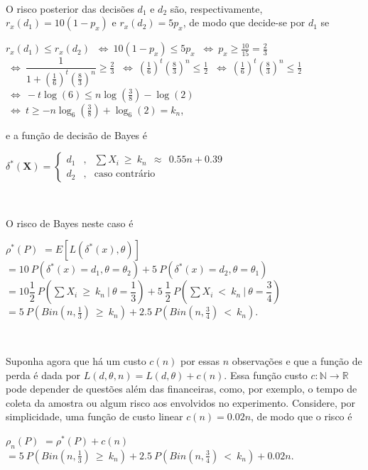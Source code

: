 \documentclass[
]{book}
\begin{document}
\(~\)

O risco posterior das decisões \(d_1\) e \(d_2\) são, respectivamente, \(r_x(d_1)=10(1-p_x)\) e \(r_x(d_2)=5p_x\), de modo que decide-se por \(d_1\) se

\(r_x(d_1)\leq r_x(d_2)\) \(~\Longleftrightarrow~ 10(1-p_x) \leq 5p_x\)
\(~\Longleftrightarrow~ p_x \geq \frac{10}{15}= \frac{2}{3}\)
\(~\Longleftrightarrow~ \dfrac{1}{1+\left(\frac{1}{6}\right)^t\left(\frac{8}{3}\right)^{n}} \geq \frac{2}{3}\)
\(~\Longleftrightarrow~ \left(\frac{1}{6}\right)^t\left(\frac{8}{3}\right)^{n} \leq \frac{1}{2}\)
\(~\Longleftrightarrow~ \left(\frac{1}{6}\right)^t\left(\frac{8}{3}\right)^{n} \leq \frac{1}{2}\)
\(~\Longleftrightarrow~ -t\log(6) \leq n\log\left(\frac{3}{8}\right)-\log\left(2\right)\)
\(~\Longleftrightarrow~ t\geq -n\log_6\left(\frac{3}{8}\right)+\log_6\left(2\right) = k_n\),

e a função de decisão de Bayes é

\({\delta}^*(\boldsymbol X) = \left\{ \begin{array}{ccl} d_1 &,& \sum X_i ~\geq~ k_n ~~\approx~~ 0.55 n + 0.39 \\ d_2 &,& \text{caso contrário} \end{array}\right.\)

\(~\)

O risco de Bayes neste caso é

\({\rho}^*(P)\) \(= E\left[L\left(\delta^*(x),\theta\right)\right]\)
\(=10~P\left(\delta^*(x)=d_1,\theta=\theta_2\right)+5~P\left(\delta^*(x)=d_2,\theta=\theta_1\right)\)
\(=10\dfrac{1}{2}~P\left(\sum X_i ~\geq~ k_n ~\Big|~ \theta=\dfrac{1}{3}\right)+5~\dfrac{1}{2}~P\left(\sum X_i ~<~ k_n ~\Big|~ \theta=\dfrac{3}{4}\right)\)
\(=5~P\left(Bin\left(n,\frac{1}{3}\right) ~\geq~ k_n \right)+2.5~P\left(Bin\left(n,\frac{3}{4}\right) ~<~ k_n \right)\).

\(~\)

Suponha agora que há um custo \(c(n)\) por essas \(n\) observações e que a função de perda é dada por \(L(d,\theta,n) = L(d,\theta) + c(n)\). Essa função custo \(c: \mathbb{N} \rightarrow \mathbb{R}\) pode depender de questões além das financeiras, como, por exemplo, o tempo de coleta da amostra ou algum risco aos envolvidos no experimento. Considere, por simplicidade, uma função de custo linear \(c(n) = 0.02n\), de modo que o risco é

\({\rho}_n(P)\) \(= {\rho}^*(P) + c(n)\) \(=5~P\left(Bin\left(n,\frac{1}{3}\right) ~\geq~ k_n \right)+2.5~P\left(Bin\left(n,\frac{3}{4}\right) ~<~ k_n \right) + 0.02n\).
\end{document}
